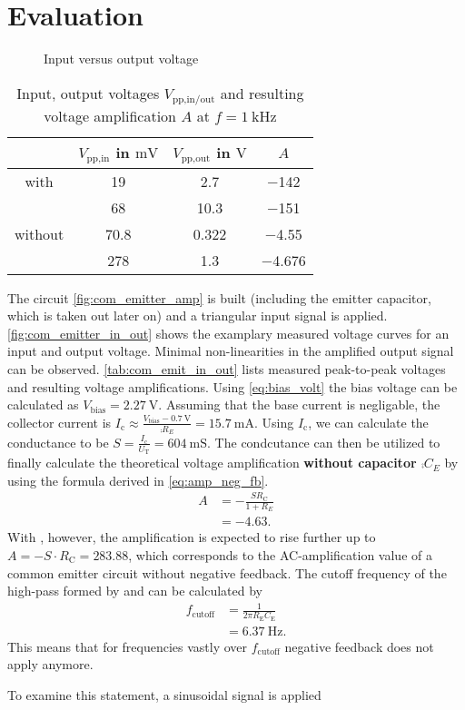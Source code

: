 \section{Evaluation}
\begin{figure}[tbp]
	\centering
	\caption{Input versus output voltage}
	\label{fig:com_emitter_in_out}
\end{figure}
\begin{table}[b!]
	\centering
	\caption{Input, output voltages $V_\text{pp,in/out}$ and resulting voltage amplification $A$ at $f=\SI{1}{\kilo\hertz}$}
	\label{tab:com_emit_in_out}
	\begin{tabular}{S|SSS}
		\toprule
		{}&	{$V_\text{pp,in}$ in $\si{\milli\volt}$}&	{$V_\text{pp,out}$ in $\si{\volt}$}&	{$A$}\\
		\midrule
		{with }	&	\num{19}	&	\num{2.7}	&	\num{-142}\\
		{}	&	\num{68}	&	\num{10.3}	&	\num{-151}\\
		\midrule
		{without }	&	\num{70.8}	&	\num{0.322}	&	\num{-4.55}\\
		{}	&	\num{278}	&	\num{1.3}	&	\num{-4.676}\\
		\bottomrule
	\end{tabular}
\end{table}
The circuit \autoref{fig:com_emitter_amp} is built (including the emitter capacitor, which is taken out later on) and a triangular input signal is applied.
\autoref{fig:com_emitter_in_out} shows the examplary measured voltage curves for an input and output voltage.
Minimal non-linearities in the amplified output signal can be observed.
\autoref{tab:com_emit_in_out} lists measured peak-to-peak voltages and resulting voltage amplifications.
Using \autoref{eq:bias_volt} the bias voltage can be calculated as $V_\text{bias}=\SI{2.27}{\volt}$.
Assuming that the base current is negligable, the collector current is $I_\text{c}\approx\frac{V_\text{bias}-\SI{0.7}{\volt}}{\comp{R_E}}=\SI{15.7}{\milli\ampere}$.
Using $I_\text{c}$, we can calculate the conductance to be $S=\frac{I_\text{c}}{U_\text{T}}=\SI{604}{\milli\siemens}$.
The condcutance can then be utilized to finally calculate the theoretical voltage amplification \textbf{without capacitor $\comp{C_E}$} by using the formula derived in \autoref{eq:amp_neg_fb}.
\begin{align*}
	A &= -\frac{SR_\text{C}}{1+R_E} \\
	&=\num{-4.63}.
\end{align*}
With , however, the amplification is expected to rise further up to $A=-S\cdot R_\text{C}=\num{283.88}$, which corresponds to the AC-amplification value of a common emitter circuit without negative feedback.
The cutoff frequency of the high-pass formed by  and  can be calculated by
\begin{align*}
	f_\text{cutoff}&=\frac{1}{2\pi R_\text{E}C_\text{E}}	\\
	&=\SI{6.37}{\hertz}.
\end{align*}
This means that for frequencies vastly over $f_\text{cutoff}$ negative feedback does not apply anymore.

To examine this statement, a sinusoidal signal is applied

